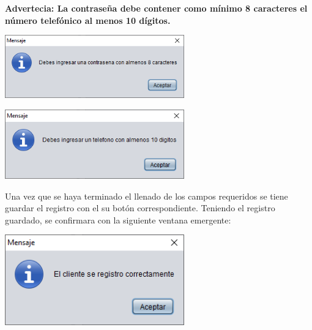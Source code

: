 \documentclass[12pt]{article}
\begin{document}
\begin{flushleft}
\vspace{0.5cm}
\textbf{Advertecia: La contraseña debe contener como mínimo 8 caracteres el número telefónico al menos 10 dígitos.}

\vspace{0.5cm}
\begin{center}
\includegraphics[width=7.75cm]{contra.png}
\end{center}
\begin{center}
\includegraphics[width=7.75cm]{telefono.png}
\end{center}

\vspace{0.5cm}
\textsf{Una vez que se haya terminado el llenado de los campos requeridos se tiene guardar el registro con el su botón correspondiente. Teniendo el registro guardado, se confirmara con la siguiente ventana emergente: }
\vspace{0.5cm}
\begin{center}
\includegraphics[width=7.75cm]{r_cliente.png}
\end{center}


\end{flushleft}
\end{document}
